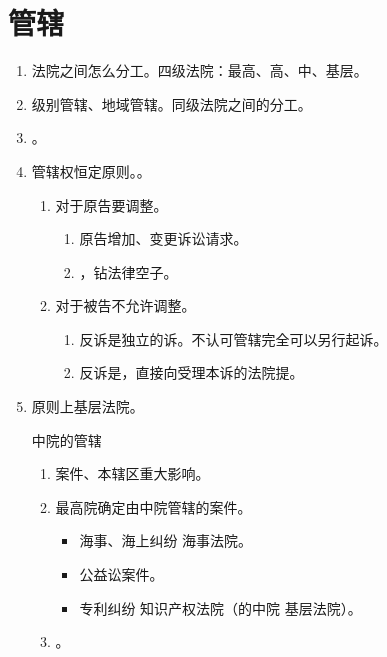 \section{管辖}
\begin{enumerate}
  \item 法院之间怎么分工。四级法院：最高、高、中、基层。
  \item 级别管辖、地域管辖。同级法院之间的分工。
  \item {}。
  \item 管辖权恒定原则。。
        \begin{enumerate}
          \item 对于原告要调整。
                \begin{enumerate}
                  \item 原告增加、变更诉讼请求。
                  \item {}，钻法律空子。
                \end{enumerate}
          \item 对于被告不允许调整。
                \begin{enumerate}
                  \item 反诉是独立的诉。不认可管辖完全可以另行起诉。
                  \item 反诉是，直接向受理本诉的法院提。
                \end{enumerate}
        \end{enumerate}
  \item 原则上基层法院。
        \begin{kk}{中院的管辖}
          \begin{enumerate}
            \item {}案件、本辖区重大影响。
            \item 最高院确定由中院管辖的案件。
                  \begin{itemize}
                    \item 海事、海上纠纷 \yjt 海事法院。
                    \item 公益讼案件。
                    \item 专利纠纷 \yjt 知识产权法院（的中院 \hz 基层法院）。
                  \end{itemize}
            \item {}。
          \end{enumerate}
        \end{kk}


\end{enumerate}
